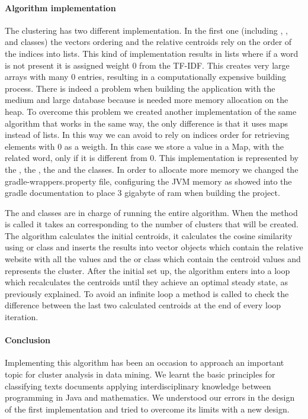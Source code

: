 \paragraph{Algorithm implementation}The clustering has two different implementation. In the first one (including , ,  and  classes) the vectors ordering and the relative centroids rely on the order of the indices into lists. This kind of implementation results in lists where if a word is not present it is assigned weight $0$ from the TF-IDF. This creates very large arrays with many $0$ entries, resulting in a computationally expensive building process. There is indeed a problem when building the application with the medium and large database because is needed more memory allocation on the heap. To overcome this problem we created another implementation of the same algorithm that works in the same way, the only difference is that it uses maps instead of lists. In this way we can avoid to rely on indices order for retrieving elements with $0$ as a weigth. In this case we store a value in a Map, with the related word, only if it is different from $0$. This implementation is represented by the , the , the  and the  classes.
In order to allocate more memory we changed the gradle-wrappers.property file, configuring the JVM memory as showed into the gradle documentation\cite{gradleDocs} to place 3 gigabyte of ram when building the project.


The  and  classes are in charge of running the entire algorithm. When the  method is called it takes an  corresponding to the number of clusters that will be created. The algorithm calculates the initial centroids, it calculates the cosine similarity using  or  class and inserts the results into vector objects which contain the relative website with all the values and the  or  class which contain the centroid values and represents the cluster. After the initial set up, the algorithm enters into a loop which recalculates the centroids until they achieve an optimal steady state, as previously explained. To avoid an infinite loop a method is called to check the difference between the last two calculated centroids at the end of every loop iteration.

\paragraph{Conclusion}Implementing this algorithm has been an occasion to approach an important topic for cluster analysis in data mining. We learnt the basic principles for classifying texts documents applying interdisciplinary knowledge between programming in Java and mathematics.
We understood our errors in the design of the first implementation and tried to overcome its limits with a new design.


